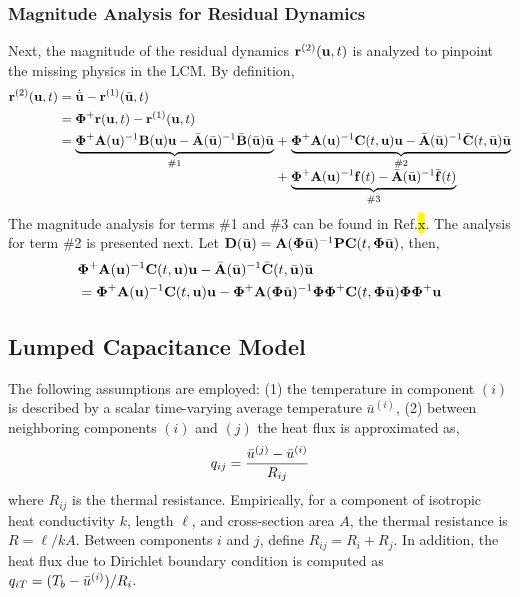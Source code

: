 \subsubsection{Magnitude Analysis for Residual Dynamics}

Next, the magnitude of the residual dynamics $\mathbf{r}^{(2)}(\mathbf{u},t)$ is analyzed to pinpoint the missing physics in the LCM. By definition,
\begin{subequations}
\begin{align}
    \vr^{(2)}(\vu,t) &= \dot{\bvu} - \vr^{(1)}(\bvu,t) \\ 
    &= \vPhiplus\vr(\vu,t) - \vr^{(1)}(\vu,t)\\
    &= \begin{array}[t]{@{}l@{\;}c@{\;}l@{}}
       \underbrace{\vPhiplus\vA(\vu)^{-1}\vB(\vu)\vu - \bvA(\bvu)^{-1}\bvB(\bvu)\bvu}_{\text{\#1}}
       & + &
       \underbrace{\vPhiplus\vA(\vu)^{-1}\vC(t,\vu)\vu - \bvA(\bvu)^{-1}\bvC(t,\bvu)\bvu}_{\text{\#2}} \\
       & + &
       \underbrace{\vPhiplus\vA(\vu)^{-1}\vf(t) - \bvA(\bvu)^{-1}\bvf(t)}_{\text{\#3}}
       \end{array}
\end{align}
\end{subequations}
The magnitude analysis for terms \#1 and \#3 can be found in Ref.\hl{x}. The analysis for term \#2 is presented next. Let $\mathbf{D}(\bar{\mathbf{u}}) = \mathbf{A}(\boldsymbol{\Phi}\bar{\mathbf{u}})^{-1}\mathbf{P}\mathbf{C}(t,\boldsymbol{\Phi}\bar{\mathbf{u}})$, then,
\begin{subequations}
    \begin{align}
        &\boldsymbol{\Phi}^{+}\mathbf{A}(\mathbf{u})^{-1}\mathbf{C}(t,\mathbf{u})\mathbf{u} - \bar{\mathbf{A}}(\bar{\mathbf{u}})^{-1}\bar{\mathbf{C}}(t,\bar{\mathbf{u}})\bar{\mathbf{u}}\\
        &= \boldsymbol{\Phi}^{+}\mathbf{A}(\mathbf{u})^{-1}\mathbf{C}(t,\mathbf{u})\mathbf{u} - \boldsymbol{\Phi}^{+}\mathbf{A}(\boldsymbol{\Phi}\bar{\mathbf{u}})^{-1}\boldsymbol{\Phi}\boldsymbol{\Phi}^{+}\mathbf{C}(t,\boldsymbol{\Phi}\bar{\mathbf{u}})\boldsymbol{\Phi}\boldsymbol{\Phi}^{+}\mathbf{u}\\
    \end{align}
\end{subequations}





\subsection{Lumped Capacitance Model}

The following assumptions are employed: (1) the temperature in component $(i)$ is described by a scalar time-varying average temperature $\bar{u}^{(i)}$, (2) between neighboring components $(i)$ and $(j)$ the heat flux is approximated as,
\begin{equation}
    q_{ij} = \frac{\bar{u}^{(j)} - \bar{u}^{(i)}}{R_{ij}}
\end{equation}
where $R_{ij}$ is the thermal resistance. Empirically, for a component of isotropic heat conductivity $k$, length $\ell$, and cross-section area $A$, the thermal resistance is $R=\ell/kA$. Between components $i$ and $j$, define $R_{ij}=R_{i} + R_{j}$. In addition, the heat flux due to Dirichlet boundary condition is computed as $q_{iT} = (T_b - \bar{u}^{(i)})/R_{i}$.

